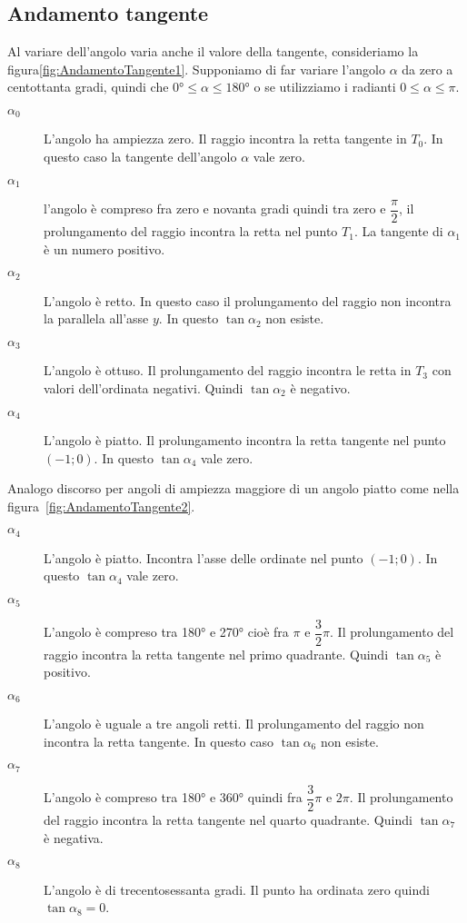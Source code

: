 \subsection{Andamento tangente}
\label{sec:AndamentoTangente}
Al variare dell'angolo varia anche il valore della tangente, consideriamo la figura\nobs\vref{fig:AndamentoTangente1}. Supponiamo di far variare l'angolo $\alpha$ da zero a centottanta gradi, quindi che $\ang{0}\leq\alpha\leq\ang{180}$ o se utilizziamo i radianti $0\leq\alpha\leq\pi$. 
\begin{description}
	\item[$\alpha_0$] L'angolo ha ampiezza zero. Il raggio incontra la retta tangente in  $T_0$. In questo caso  la tangente  dell'angolo $\alpha$  vale zero.
	\item [$\alpha_1$] l'angolo è compreso fra zero e novanta gradi quindi tra zero e $\dfrac{\pi}{2}$, il prolungamento del raggio  incontra la retta nel punto $T_1$. La tangente di $\alpha_1$ è un numero positivo.
	\item [$\alpha_2$] L'angolo  è retto. In questo caso il prolungamento del raggio non incontra la parallela all'asse $y$. In questo    $\tan\alpha_2$ non esiste. 
	\item [$\alpha_3$]  L'angolo è ottuso. Il prolungamento del raggio incontra le retta in $T_3$  con valori dell'ordinata negativi. Quindi $\tan\alpha_2$ è negativo.
	\item [$\alpha_4$] L'angolo  è  piatto. Il  prolungamento incontra la retta tangente  nel punto $(-1;0)$. In questo  $\tan\alpha_4$ vale zero.
\end{description}
Analogo discorso per angoli di ampiezza  maggiore di un angolo  piatto come nella figura~\vref{fig:AndamentoTangente2}.
\begin{description}
	\item [$\alpha_4$] L'angolo è piatto. Incontra l'asse delle ordinate nel punto $(-1;0)$. In questo  $\tan\alpha_4$ vale zero.
	\item [$\alpha_5$] L'angolo è compreso tra \ang{180} e \ang{270} cioè fra $\pi$ e $\dfrac{3}{2}\pi$. Il prolungamento del raggio incontra la retta tangente  nel primo quadrante. Quindi $\tan\alpha_5$ è positivo.
	\item [$\alpha_6$] L'angolo è uguale a tre angoli retti. Il prolungamento del raggio non incontra la retta  tangente. In questo caso  $\tan\alpha_6$ non esiste. 
	\item [$\alpha_7$] L'angolo è compreso tra \ang{180} e \ang{360} quindi fra $\dfrac{3}{2}\pi$ e $2\pi$. Il prolungamento del raggio incontra la retta tangente nel quarto quadrante. Quindi $\tan\alpha_7$ è negativa.
	\item [$\alpha_8$] L'angolo è di trecentosessanta gradi. Il punto ha ordinata zero quindi  $\tan\alpha_8=0$.
\end{description}
